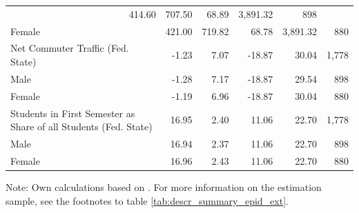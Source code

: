 \documentclass[a4paper, oneside, hyperfootnotes = false]{article}
\begin{document}
{\begin{table}[ht]
\begin{center}
{\begin{tabular}{llllll}
			\multicolumn{1}{r}{414.60} &
			\multicolumn{1}{r}{707.50} &
			\multicolumn{1}{r}{68.89} &
			\multicolumn{1}{r}{3,891.32} &
			\multicolumn{1}{r}{898} \\
			\multicolumn{1}{l}{\hspace{1em}Female} &
			\multicolumn{1}{r}{421.00} &
			\multicolumn{1}{r}{719.82} &
			\multicolumn{1}{r}{68.78} &
			\multicolumn{1}{r}{3,891.32} &
			\multicolumn{1}{r}{880} \\
			\multicolumn{1}{l}{Net Commuter Traffic (Fed. State)} &
			\multicolumn{1}{r}{-1.23} &
			\multicolumn{1}{r}{7.07} &
			\multicolumn{1}{r}{-18.87} &
			\multicolumn{1}{r}{30.04} &
			\multicolumn{1}{r}{1,778} \\
			\multicolumn{1}{l}{\hspace{1em}Male} &
			\multicolumn{1}{r}{-1.28} &
			\multicolumn{1}{r}{7.17} &
			\multicolumn{1}{r}{-18.87} &
			\multicolumn{1}{r}{29.54} &
			\multicolumn{1}{r}{898} \\
			\multicolumn{1}{l}{\hspace{1em}Female} &
			\multicolumn{1}{r}{-1.19} &
			\multicolumn{1}{r}{6.96} &
			\multicolumn{1}{r}{-18.87} &
			\multicolumn{1}{r}{30.04} &
			\multicolumn{1}{r}{880} \\
			\multicolumn{1}{l}{Students in First Semester as Share of all Students (Fed. State)} &
			\multicolumn{1}{r}{16.95} &
			\multicolumn{1}{r}{2.40} &
			\multicolumn{1}{r}{11.06} &
			\multicolumn{1}{r}{22.70} &
			\multicolumn{1}{r}{1,778} \\
			\multicolumn{1}{l}{\hspace{1em}Male} &
			\multicolumn{1}{r}{16.94} &
			\multicolumn{1}{r}{2.37} &
			\multicolumn{1}{r}{11.06} &
			\multicolumn{1}{r}{22.70} &
			\multicolumn{1}{r}{898} \\
			\multicolumn{1}{l}{\hspace{1em}Female} &
			\multicolumn{1}{r}{16.96} &
			\multicolumn{1}{r}{2.43} &
			\multicolumn{1}{r}{11.06} &
			\multicolumn{1}{r}{22.70} &
			\multicolumn{1}{r}{880} \\
			\bottomrule
	\end{tabular}}

\vspace{2mm}

\parbox{15cm}{
	\linespread{1}\footnotesize Note: Own calculations based on \cite{SOEP2023}. For more information on the estimation sample, see the footnotes to table \ref{tab:descr_summary_epid_ext}.}

\end{center}
\end{table}

}
\end{document}
